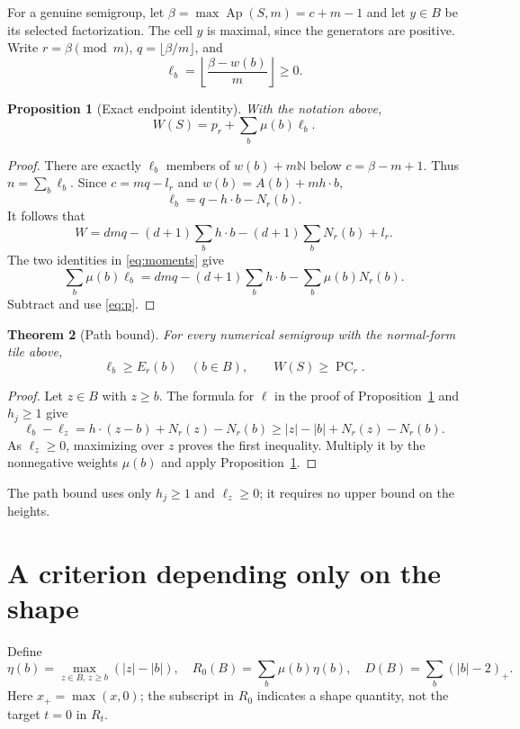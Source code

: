 \documentclass[11pt]{article}
\newtheorem{theorem}{Theorem}[section]
\newtheorem{proposition}[theorem]{Proposition}
\theoremstyle{definition}
\theoremstyle{remark}
\newcommand{\N}{\mathbb{N}}
\newcommand{\Ap}{\operatorname{Ap}}
\newcommand{\PC}{\operatorname{PC}}
\newcommand{\pos}[1]{(#1)_{+}}
\begin{document}
For a genuine semigroup, let $\beta=\max\Ap(S,m)=c+m-1$ and let $y\in B$
be its selected factorization. The cell $y$ is maximal, since the
generators are positive. Write $r=\beta\pmod m$, $q=\lfloor\beta/m\rfloor$,
and
\[
\ell_b=\left\lfloor\frac{\beta-w(b)}m\right\rfloor\ge0.
\]

\begin{proposition}[Exact endpoint identity]\label{prop:identity}
With the notation above,
\begin{equation}\label{eq:identity}
W(S)=p_r+\sum_b\mu(b)\ell_b.
\end{equation}
\end{proposition}
\begin{proof}
There are exactly $\ell_b$ members of
$w(b)+m\N$ below $c=\beta-m+1$. Thus $n=\sum_b\ell_b$.
Since $c=mq-l_r$ and $w(b)=A(b)+m h\cdot b$,
\[
\ell_b=q-h\cdot b-N_r(b).
\]
It follows that
\[
W=dmq-(d+1)\sum_b h\cdot b-(d+1)\sum_bN_r(b)+l_r.
\]
The two identities in \eqref{eq:moments} give
\[
\sum_b\mu(b)\ell_b
=dmq-(d+1)\sum_b h\cdot b-\sum_b\mu(b)N_r(b).
\]
Subtract and use \eqref{eq:p}.
\end{proof}

\begin{theorem}[Path bound]\label{thm:path}
For every numerical semigroup with the normal-form tile above,
\begin{equation}\label{eq:pathbound}
\ell_b\ge E_r(b)\quad(b\in B),\qquad W(S)\ge\PC_r.
\end{equation}
\end{theorem}
\begin{proof}
Let $z\in B$ with $z\ge b$. The formula for $\ell$ in the proof of
Proposition~\ref{prop:identity} and $h_j\ge1$ give
\[
\ell_b-\ell_z
=h\cdot(z-b)+N_r(z)-N_r(b)
\ge |z|-|b|+N_r(z)-N_r(b).
\]
As $\ell_z\ge0$, maximizing over $z$ proves the first inequality.
Multiply it by the nonnegative weights $\mu(b)$ and apply
Proposition~\ref{prop:identity}.
\end{proof}

The path bound uses only $h_j\ge1$ and $\ell_z\ge0$; it requires no
upper bound on the heights.

\section{A criterion depending only on the shape}

Define
\begin{equation}\label{eq:shape}
\eta(b)=\max_{z\in B,\,z\ge b}(|z|-|b|),\quad
R_0(B)=\sum_b\mu(b)\eta(b),\quad
D(B)=\sum_b\pos{|b|-2}.
\end{equation}
Here $x_+=\max(x,0)$; the subscript in $R_0$ indicates a shape quantity,
not the target $t=0$ in $R_t$.
\end{document}
